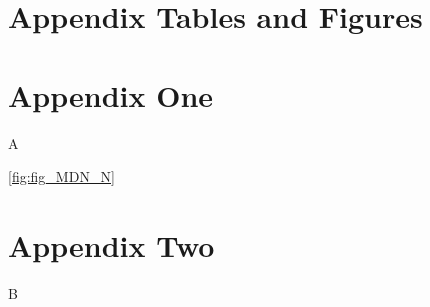 \documentclass[12pt]{article}
\begin{document}
\newpage
\appendix
\setcounter{table}{0}
\renewcommand{\tablename}{Appendix Table}
\renewcommand{\figurename}{Appendix Figure}
\renewcommand{\thetable}{A\arabic{table}}
\setcounter{figure}{0}
\renewcommand{\thefigure}{A\arabic{figure}}

\section{Appendix Tables and Figures}
% 

\newpage 
\section{Appendix One \label{sec:appendix:first}}
\renewcommand{\thetable}{B\arabic{table}}
\setcounter{table}{0}
\renewcommand{\thefigure}{B\arabic{figure}}
\setcounter{figure}{0}

A


\ref{fig:fig_MDN_N}

\newpage
\section{Appendix Two \label{sec:appendix:two}}
\renewcommand{\thetable}{C\arabic{table}}
\setcounter{table}{0}
\renewcommand{\thefigure}{C\arabic{figure}}
\setcounter{figure}{0}

B
\end{document}
